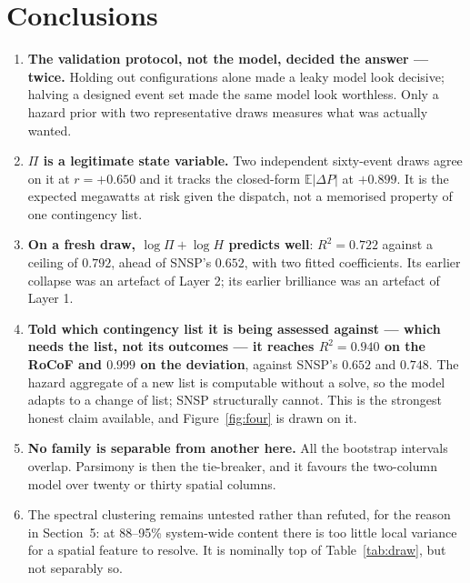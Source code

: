 \documentclass[11pt,a4paper]{article}
\newcommand{\Rtwo}{\ensuremath{R^{2}}}
\begin{document}
\section{Conclusions}

\begin{enumerate}\itemsep2pt
\item \textbf{The validation protocol, not the model, decided the answer ---
twice.} Holding out configurations alone made a leaky model look decisive;
halving a designed event set made the same model look worthless. Only a
hazard prior with two representative draws measures what was actually wanted.
\item \textbf{$\Pi$ is a legitimate state variable.} Two independent
sixty-event draws agree on it at $r=+0.650$ and it tracks the closed-form
$\mathbb{E}|\Delta P|$ at $+0.899$. It is the expected megawatts at risk given
the dispatch, not a memorised property of one contingency list.
\item \textbf{On a fresh draw, $\log\Pi + \log H$ predicts well}: $\Rtwo =
0.722$ against a ceiling of $0.792$, ahead of SNSP's $0.652$, with two fitted
coefficients. Its earlier collapse was an artefact of Layer 2; its earlier
brilliance was an artefact of Layer 1.
\item \textbf{Told which contingency list it is being assessed against ---
which needs the list, not its outcomes --- it reaches $\Rtwo = 0.940$ on the
RoCoF and $0.999$ on the deviation}, against SNSP's $0.652$ and $0.748$. The
hazard aggregate of a new list is computable without a solve, so the model
adapts to a change of list; SNSP structurally cannot. This is the strongest
honest claim available, and Figure~\ref{fig:four} is drawn on it.
\item \textbf{No family is separable from another here.} All the bootstrap
intervals overlap. Parsimony is then the tie-breaker, and it favours the
two-column model over twenty or thirty spatial columns.
\item The spectral clustering remains untested rather than refuted, for the
reason in Section~5: at 88--95\% system-wide content there is too little local
variance for a spatial feature to resolve. It is nominally top of
Table~\ref{tab:draw}, but not separably so.
\end{enumerate}
\end{document}
